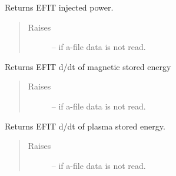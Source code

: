 \documentclass[letterpaper,10pt,english]{sphinxmanual}
\begin{document}
\begin{fulllineitems}

\begin{fulllineitems}
\label{eqtools:eqtools.eqdskreader.EqdskReader.getPinj}
Returns EFIT injected power.
\begin{quote}\begin{description}
\item[{Raises }] \leavevmode
{} -- 
if a-file data is not read.

\end{description}\end{quote}

\end{fulllineitems}


\begin{fulllineitems}
\label{eqtools:eqtools.eqdskreader.EqdskReader.getWbdot}
Returns EFIT d/dt of magnetic stored energy
\begin{quote}\begin{description}
\item[{Raises }] \leavevmode
{} -- 
if a-file data is not read.

\end{description}\end{quote}

\end{fulllineitems}


\begin{fulllineitems}
\label{eqtools:eqtools.eqdskreader.EqdskReader.getWpdot}
Returns EFIT d/dt of plasma stored energy.
\begin{quote}\begin{description}
\item[{Raises }] \leavevmode
{} -- 
if a-file data is not read.

\end{description}\end{quote}

\end{fulllineitems}



\end{fulllineitems}
\end{document}
